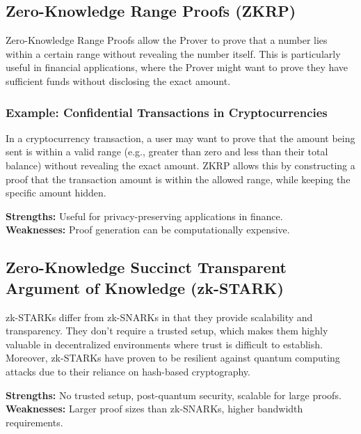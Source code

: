 \subsection{Zero-Knowledge Range Proofs (ZKRP)}
Zero-Knowledge Range Proofs allow the Prover to prove that a number lies within a certain range without revealing the number itself. This is particularly useful in financial applications, where the Prover might want to prove they have sufficient funds without disclosing the exact amount.

\subsubsection{Example: Confidential Transactions in Cryptocurrencies}
In a cryptocurrency transaction, a user may want to prove that the amount being sent is within a valid range (e.g., greater than zero and less than their total balance) without revealing the exact amount. ZKRP allows this by constructing a proof that the transaction amount is within the allowed range, while keeping the specific amount hidden.

\justify
\textbf{Strengths:} Useful for privacy-preserving applications in finance.\\
\textbf{Weaknesses:} Proof generation can be computationally expensive.

\subsection{Zero-Knowledge Succinct Transparent Argument of Knowledge (zk-STARK)}
zk-STARKs differ from zk-SNARKs in that they provide scalability and transparency. They don't require a trusted setup, which makes them highly valuable in decentralized environments where trust is difficult to establish. Moreover, zk-STARKs have proven to be resilient against quantum computing attacks due to their reliance on hash-based cryptography.

\justify
\textbf{Strengths:} No trusted setup, post-quantum security, scalable for large proofs.\\
\textbf{Weaknesses:} Larger proof sizes than zk-SNARKs, higher bandwidth requirements.